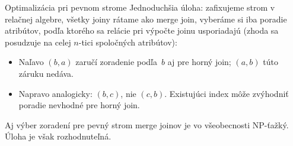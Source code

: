 \documentclass[12pt]{beamer}
\begin{document}
\begin{frame}{Optimalizácia pri pevnom strome}
  Jednoduchšia úloha: zafixujeme strom v relačnej algebre, všetky joiny rátame ako \alert{merge join},
  vyberáme si iba poradie atribútov, podľa ktorého sa relácie pri výpočte joinu usporiadajú (zhoda sa posudzuje na celej $n$-tici spoločných atribútov):
  \begin{center}
  \end{center}
  \begin{itemize}
    \item Naľavo $(b,a)$ zaručí zoradenie podľa~$b$ aj pre horný join;
      $(a,b)$ túto záruku nedáva.
    \item Napravo analogicky: $(b,c)$, nie $(c,b)$.
      Existujúci index môže zvýhodniť poradie nevhodné pre horný join.
  \end{itemize}
  Aj výber zoradení pre pevný strom merge joinov je vo všeobecnosti
  \alert{NP-ťažký}. Úloha je však rozhodnuteľná.

\end{frame}
\end{document}
